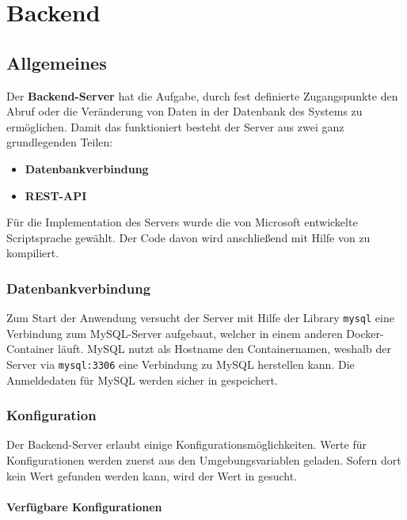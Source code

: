 \part{Backend}
\label{backend}

\chapter{Allgemeines}

Der \textbf{Backend-Server} hat die Aufgabe, durch fest definierte Zugangspunkte den Abruf oder die Veränderung von Daten in der Datenbank des Systems zu ermöglichen. Damit das funktioniert besteht der Server aus zwei ganz grundlegenden Teilen:

\begin{itemize}
    \item \textbf{Datenbankverbindung}
    \item \textbf{REST-API}
\end{itemize}

Für die Implementation des Servers wurde die von Microsoft entwickelte Scriptsprache \textit{} gewählt. Der Code davon wird anschließend mit Hilfe von \textit{} zu \textit{} kompiliert.

\section{Datenbankverbindung}

Zum Start der Anwendung versucht der Server mit Hilfe der Library \lstinline{mysql} eine Verbindung zum MySQL-Server aufgebaut, welcher in einem anderen Docker-Container läuft. MySQL nutzt als Hostname den Containernamen, weshalb der Server via \lstinline{mysql:3306} eine Verbindung zu MySQL herstellen kann. Die Anmeldedaten für MySQL werden sicher in \textit{} gespeichert.

\section{Konfiguration}

Der Backend-Server erlaubt einige Konfigurationsmöglichkeiten. Werte für Konfigurationen werden zuerst aus den Umgebungsvariablen geladen. Sofern dort kein Wert gefunden werden kann, wird der Wert in \textit{} gesucht.

\subsection{Verfügbare Konfigurationen}

